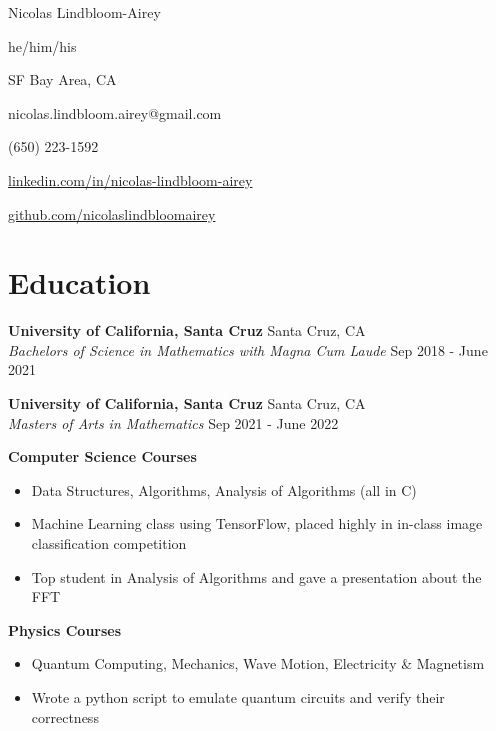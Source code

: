 \documentclass[10pt,letterpaper]{article}
\begin{document}
\begin{minipage}[t]{0.6\textwidth}
{\Huge Nicolas Lindbloom-Airey}

he/him/his
\end{minipage}
\begin{minipage}[t]{0.4\textwidth}
SF Bay Area, CA 

 nicolas.lindbloom.airey@gmail.com

 (650) 223-1592 

 \href{https://www.linkedin.com/in/nicolas-lindbloom-airey/}{linkedin.com/in/nicolas-lindbloom-airey} 

 \href{https://github.com/nicolaslindbloomairey}{github.com/nicolaslindbloomairey} 

\end{minipage}


\section*{Education} \hrulefill 

\textbf{University of California, Santa Cruz} \hfill  Santa Cruz, CA\\
\textit{Bachelors of Science in Mathematics with Magna Cum Laude} \hfill  Sep 2018 - June 2021

\textbf{University of California, Santa Cruz} \hfill  Santa Cruz, CA\\
\textit{Masters of Arts in Mathematics} \hfill  Sep 2021 - June 2022

\textbf{Computer Science Courses}
\begin{itemize}
    \item Data Structures, Algorithms, Analysis of Algorithms (all in C)
    \item Machine Learning class using TensorFlow, placed highly in in-class image classification competition
    \item Top student in Analysis of Algorithms and gave a presentation about the FFT
\end{itemize}

\textbf{Physics Courses}
\begin{itemize}
    \item Quantum Computing, Mechanics, Wave Motion, Electricity \& Magnetism
    \item Wrote a python script to emulate quantum circuits and verify their correctness
\end{itemize}
\end{document}
